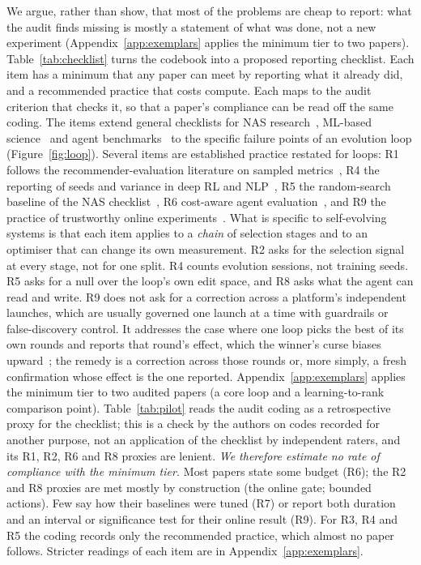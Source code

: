 \documentclass[sigconf,nonacm]{acmart}
\begin{document}
We argue, rather than show, that most of the problems are cheap to report: what the audit finds missing is mostly a statement of what was done, not a new experiment (Appendix~\ref{app:exemplars} applies the minimum tier to two papers). Table~\ref{tab:checklist} turns the codebook into a proposed reporting checklist. Each item has a minimum that any
paper can meet by reporting what it already did, and a recommended practice that costs compute. Each maps to the
audit criterion that checks it, so that a paper's compliance can be read off the same coding. The items extend
general checklists for NAS research~\cite{lindauer2020bestpractices}, ML-based science~\cite{kapoor2024reforms} and
agent benchmarks~\cite{zhu2025abc} to the specific failure points of an evolution loop (Figure~\ref{fig:loop}).
Several items are established practice restated for loops: R1 follows the recommender-evaluation literature on sampled
metrics~\cite{krichene2020sampled}, R4 the reporting of seeds and variance in deep RL and NLP~\cite{henderson2018deeprl,
agarwal2021precipice,dodge2019showyourwork}, R5 the random-search baseline of the NAS checklist~\cite{lindauer2020bestpractices},
R6 cost-aware agent evaluation~\cite{kapoor2025agentsmatter}, and R9 the practice of trustworthy online
experiments~\cite{kohavi2020trustworthy}. What is specific to self-evolving systems is that each item applies to a
\emph{chain} of selection stages and to an optimiser that can change its own measurement. R2 asks for the selection
signal at every stage, not for one split. R4 counts evolution sessions, not training seeds. R5 asks for a null over the
loop's own edit space, and R8 asks what the agent can read and write. R9 does not ask for a correction across a platform's independent launches, which are usually governed one launch at a
time with guardrails or false-discovery control. It addresses the case where one loop picks the best of its own rounds and
reports that round's effect, which the winner's curse biases upward~\cite{lee2018winnerscurse}; the remedy is a correction
across those rounds or, more simply, a fresh confirmation whose effect is the one reported. Appendix~\ref{app:exemplars} applies the minimum tier to two audited
papers (a core loop and a learning-to-rank comparison point). Table~\ref{tab:pilot} reads the audit coding as a retrospective proxy for the checklist; this is a check by
the authors on codes recorded for another purpose, not an application of the checklist by independent raters, and its
R1, R2, R6 and R8 proxies are lenient. \emph{We therefore estimate no rate of compliance with the minimum tier.} Most
papers state some budget (R6); the R2 and R8 proxies are met mostly by construction (the online gate; bounded actions). Few say
how their baselines were tuned (R7) or report both duration and an interval or significance test for their online result (R9). For R3, R4
and R5 the coding records only the recommended practice, which almost no paper follows. Stricter readings of each item are in Appendix~\ref{app:exemplars}.
\end{document}

